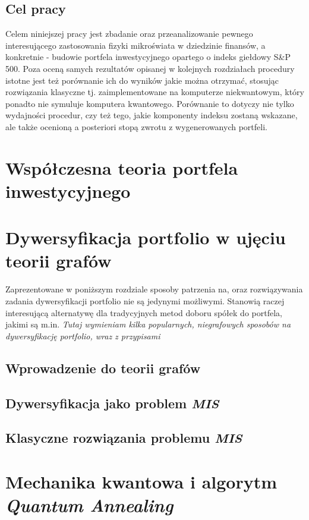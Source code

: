 \documentclass[12pt,a4paper,twoside,openany]{book}
\begin{document}
\section{Cel pracy}
Celem niniejszej pracy jest zbadanie oraz przeanalizowanie pewnego interesującego zastosowania fizyki mikroświata w dziedzinie finansów, a konkretnie - budowie portfela inwestycyjnego opartego o indeks giełdowy S\&P 500. Poza oceną samych rezultatów opisanej w kolejnych rozdziałach procedury istotne jest też porównanie ich do wyników jakie można otrzymać, stosując rozwiązania klasyczne tj. zaimplementowane na komputerze niekwantowym, który ponadto nie symuluje komputera kwantowego. Porównanie to dotyczy nie tylko wydajności procedur, czy też tego, jakie komponenty indeksu zostaną wskazane, ale także ocenioną a posteriori stopą zwrotu z wygenerowanych portfeli.

\chapter{Współczesna teoria portfela inwestycyjnego}

\chapter{Dywersyfikacja portfolio w ujęciu teorii grafów}
Zaprezentowane w poniższym rozdziale sposoby patrzenia na, oraz rozwiązywania zadania dywersyfikacji portfolio nie są jedynymi możliwymi. Stanowią raczej interesującą alternatywę dla tradycyjnych metod doboru spółek do portfela, jakimi są m.in. \textit{Tutaj wymieniam kilka popularnych, niegrafowych sposobów na dywersyfikację portfolio, wraz z przypisami}

\section{Wprowadzenie do teorii grafów}

\section{Dywersyfikacja jako problem \textit{MIS}}

\section{Klasyczne rozwiązania problemu \textit{MIS}}

\chapter{Mechanika kwantowa i algorytm \textit{Quantum Annealing}}
\end{document}
